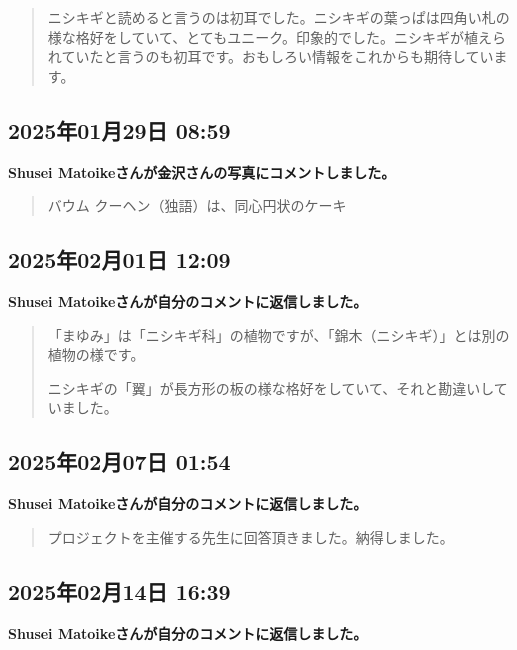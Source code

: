 \begin{quote}
ニシキギと読めると言うのは初耳でした。ニシキギの葉っぱは四角い札の様な格好をしていて、とてもユニーク。印象的でした。ニシキギが植えられていたと言うのも初耳です。おもしろい情報をこれからも期待しています。
\end{quote}

\subsection*{2025年01月29日 08:59}

\textbf{Shusei Matoikeさんが金沢さんの写真にコメントしました。}

\begin{quote}
バウム クーヘン（独語）は、同心円状のケーキ
\end{quote}

\subsection*{2025年02月01日 12:09}

\textbf{Shusei Matoikeさんが自分のコメントに返信しました。}

\begin{quote}
「まゆみ」は「ニシキギ科」の植物ですが、「錦木（ニシキギ）」とは別の植物の様です。

ニシキギの「翼」が長方形の板の様な格好をしていて、それと勘違いしていました。
\end{quote}

\subsection*{2025年02月07日 01:54}

\textbf{Shusei Matoikeさんが自分のコメントに返信しました。}

\begin{quote}
プロジェクトを主催する先生に回答頂きました。納得しました。
\end{quote}

\subsection*{2025年02月14日 16:39}

\textbf{Shusei Matoikeさんが自分のコメントに返信しました。}

